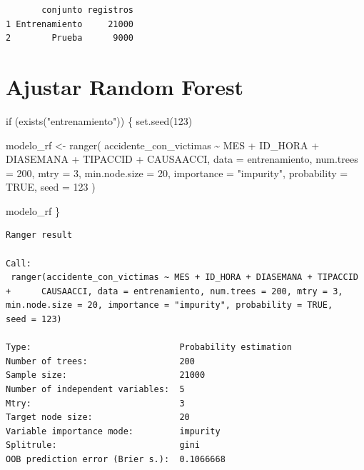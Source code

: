 \documentclass[
  spanish,
  11pt,
  letterpaper,
]{book}
\newenvironment{Shaded}{}{}
\newcommand{\AttributeTok}[1]{\textcolor[rgb]{0.84,0.23,0.29}{#1}}
\newcommand{\ConstantTok}[1]{\textcolor[rgb]{0.00,0.36,0.77}{#1}}
\newcommand{\ControlFlowTok}[1]{\textcolor[rgb]{0.84,0.23,0.29}{#1}}
\newcommand{\DecValTok}[1]{\textcolor[rgb]{0.00,0.36,0.77}{#1}}
\newcommand{\FunctionTok}[1]{\textcolor[rgb]{0.44,0.26,0.76}{#1}}
\newcommand{\NormalTok}[1]{\textcolor[rgb]{0.14,0.16,0.18}{#1}}
\newcommand{\OtherTok}[1]{\textcolor[rgb]{0.44,0.26,0.76}{#1}}
\newcommand{\SpecialCharTok}[1]{\textcolor[rgb]{0.00,0.36,0.77}{#1}}
\newcommand{\StringTok}[1]{\textcolor[rgb]{0.01,0.18,0.38}{#1}}
\begin{document}
\begin{verbatim}
       conjunto registros
1 Entrenamiento     21000
2        Prueba      9000
\end{verbatim}

\section{Ajustar Random Forest}\label{ajustar-random-forest}

\begin{Shaded}
\begin{Highlighting}[]
\ControlFlowTok{if}\NormalTok{ (}\FunctionTok{exists}\NormalTok{(}\StringTok{"entrenamiento"}\NormalTok{)) \{}
  \FunctionTok{set.seed}\NormalTok{(}\DecValTok{123}\NormalTok{)}

\NormalTok{  modelo\_rf }\OtherTok{\textless{}{-}} \FunctionTok{ranger}\NormalTok{(}
\NormalTok{    accidente\_con\_victimas }\SpecialCharTok{\textasciitilde{}}\NormalTok{ MES }\SpecialCharTok{+}\NormalTok{ ID\_HORA }\SpecialCharTok{+}\NormalTok{ DIASEMANA }\SpecialCharTok{+}\NormalTok{ TIPACCID }\SpecialCharTok{+}\NormalTok{ CAUSAACCI,}
    \AttributeTok{data =}\NormalTok{ entrenamiento,}
    \AttributeTok{num.trees =} \DecValTok{200}\NormalTok{,}
    \AttributeTok{mtry =} \DecValTok{3}\NormalTok{,}
    \AttributeTok{min.node.size =} \DecValTok{20}\NormalTok{,}
    \AttributeTok{importance =} \StringTok{"impurity"}\NormalTok{,}
    \AttributeTok{probability =} \ConstantTok{TRUE}\NormalTok{,}
    \AttributeTok{seed =} \DecValTok{123}
\NormalTok{  )}

\NormalTok{  modelo\_rf}
\NormalTok{\}}
\end{Highlighting}
\end{Shaded}

\begin{verbatim}
Ranger result

Call:
 ranger(accidente_con_victimas ~ MES + ID_HORA + DIASEMANA + TIPACCID +      CAUSAACCI, data = entrenamiento, num.trees = 200, mtry = 3,      min.node.size = 20, importance = "impurity", probability = TRUE,      seed = 123) 

Type:                             Probability estimation 
Number of trees:                  200 
Sample size:                      21000 
Number of independent variables:  5 
Mtry:                             3 
Target node size:                 20 
Variable importance mode:         impurity 
Splitrule:                        gini 
OOB prediction error (Brier s.):  0.1066668 
\end{verbatim}
\end{document}

